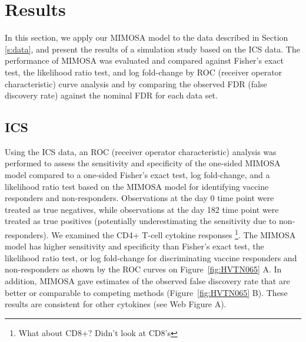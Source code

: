 \documentclass[useAMS,referee,usenatbib]{biom}
\begin{document}
\section{Results}
\label{s:results}
In this section, we apply our MIMOSA model to the data described in Section \ref{s:data}, and present the results of a simulation study based on the ICS data. The performance of MIMOSA was evaluated and compared against Fisher's exact test, the likelihood ratio test, and log fold-change by ROC (receiver operator characteristic) curve analysis and by comparing the observed FDR (false discovery rate) against the nominal FDR for each data set.


\subsection{ICS}
Using the ICS data, an ROC (receiver operator characteristic) analysis was performed to assess the sensitivity and specificity of the one-sided MIMOSA model compared to a one-sided Fisher's exact test, log fold-change, and a likelihood ratio test based on the MIMOSA model for identifying vaccine responders and non-responders. Observations at the day 0 time point were treated as true negatives, while observations at the day 182 time point were treated as true positives (potentially underestimating the sensitivity due to non-responders). We examined the CD4+ T-cell cytokine responses \footnote{What about CD8+? Didn't look at CD8's}. The MIMOSA model has higher sensitivity and specificity than Fisher's exact test, the likelihood ratio test, or log fold-change for discriminating vaccine responders and non-responders  as shown by the ROC curves on Figure~\ref{fig:HVTN065} A. 
In addition, MIMOSA gave estimates of the observed false discovery rate that are better or comparable to competing methods (Figure~\ref{fig:HVTN065} B). These results are consistent for other cytokines (see Web Figure A).
\end{document}
